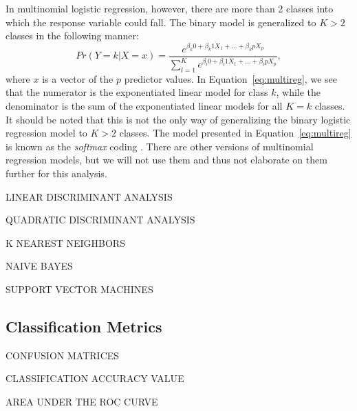\documentclass[12pt]{article}
\begin{document}
 In multinomial logistic regression, however, there are more than 2 classes 
 into which the response variable could fall.  The binary model is generalized 
 to $K > 2$ classes in the following manner:
 \begin{equation}
  \label{eq:multireg}
  Pr( Y = k | X = x ) = 
  \frac{e ^ {\beta_k0 + \beta_k1X_1 + ... + \beta_kpX_p}}
  { \sum_{l = 1} ^ {K}  e ^ {\beta_l0 + \beta_l1X_1 + ... + \beta_lpX_p}},
\end{equation}
where $x$ is a vector of the $p$ predictor values.  In 
Equation~\eqref{eq:multireg}, we see that the numerator is the exponentiated 
linear model for class $k$, while the denominator is the sum of the exponentiated 
linear models for all $K = k$ classes.  It should be noted that this is not the 
only way of generalizing the binary logistic regression model to $K >2$ classes.  
The model presented in Equation~\eqref{eq:multireg} is known as the \textit{softmax} 
coding \citep{james2021introduction}.  There are other versions of multinomial 
regression models, but we will not use them and thus not elaborate on them further 
for this analysis.  

LINEAR DISCRIMINANT ANALYSIS

QUADRATIC DISCRIMINANT ANALYSIS 

K NEAREST NEIGHBORS

NAIVE BAYES

SUPPORT VECTOR MACHINES

\subsection{Classification Metrics}
\label{sec:metr}

CONFUSION MATRICES

CLASSIFICATION ACCURACY VALUE

AREA UNDER THE ROC CURVE



\end{document}
